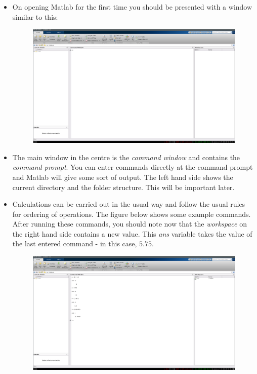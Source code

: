 \documentclass[12pt]{report}
\begin{document}
\begin{itemize}
\item On opening Matlab for the first time you should be presented with a window similar to this:
\begin{figure}[h]		
	\centering
	\includegraphics[width=1\textwidth]{matlab.png} 
    \caption*{}
\end{figure}
\item The main window in the centre is the \textit{command window} and contains the \textit{command prompt}. You can enter commands directly at the command prompt and Matlab will give some sort of output. The left hand side shows the current directory and the folder structure. This will be important later.
\item Calculations can be carried out in the usual way and follow the usual rules for ordering of operations. The figure below shows some example commands. After running these commands, you should note now that the \textit{workspace} on the right hand side contains a new value. This \textit{ans} variable takes the value of the last entered command - in this case, $5.75$.
\begin{figure}[h]		
	\centering
	\includegraphics[width=1\textwidth]{matlabcalc.png} 

\end{figure}
\end{itemize}
\end{document}
